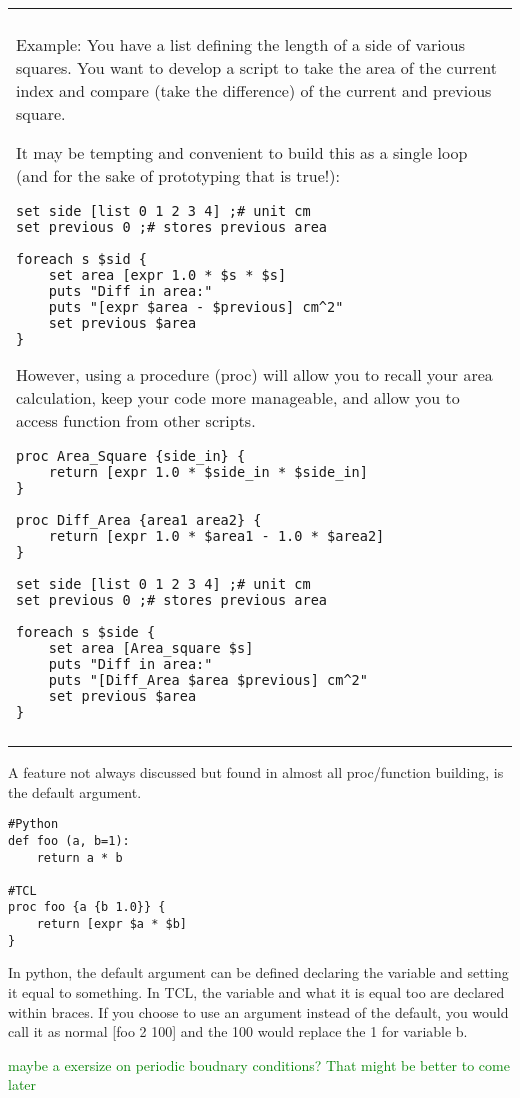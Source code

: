 \documentclass[letter,11pt]{article}
\newcommand{\atGB}[1]{\textcolor{green}{#1}}
\newenvironment{exercise}
    {\begin{center}
    \begin{tabular}{|p{0.9\textwidth}|}
    \hline\\
    }
    { 
    \\\\\hline
    \end{tabular} 
    \end{center}
    }
\begin{document}
\begin{exercise}
Example: You have a list defining the length of a side of various squares. You want to develop a script to take the area of the current index and compare (take the difference) of the current and previous square.

It may be tempting and convenient to build this as a single loop (and for the sake of prototyping that is true!):

\begin{lstlisting}
set side [list 0 1 2 3 4] ;# unit cm
set previous 0 ;# stores previous area

foreach s $sid {
	set area [expr 1.0 * $s * $s]
	puts "Diff in area:"
	puts "[expr $area - $previous] cm^2"
	set previous $area
}
\end{lstlisting}

However, using a procedure (proc) will allow you to recall your area calculation, keep your code more manageable, and allow you to access function from other scripts.

\begin{lstlisting}
proc Area_Square {side_in} {
	return [expr 1.0 * $side_in * $side_in]
}

proc Diff_Area {area1 area2} {
	return [expr 1.0 * $area1 - 1.0 * $area2]
}

set side [list 0 1 2 3 4] ;# unit cm
set previous 0 ;# stores previous area

foreach s $side {
	set area [Area_square $s]
	puts "Diff in area:"
	puts "[Diff_Area $area $previous] cm^2"
	set previous $area
}
\end{lstlisting}
\end{exercise}

A feature not always discussed but found in almost all proc/function building, is the default argument.
\begin{lstlisting}
#Python
def foo (a, b=1):
	return a * b

#TCL
proc foo {a {b 1.0}} {
	return [expr $a * $b]
}
\end{lstlisting}
In python, the default argument can be defined declaring the variable and setting it equal to something. In TCL, the variable and what it is equal too are declared within braces. If you choose to use an argument instead of the default, you would call it as normal [foo 2 100] and the 100 would replace the 1 for variable b.

\atGB{maybe a exersize on periodic boudnary conditions? That might be better to come later}
\end{document}
